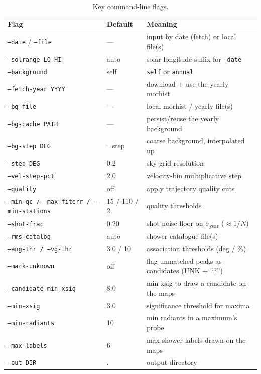 \documentclass[11pt]{article}
\newcommand{\flag}[1]{\texttt{#1}}
\begin{document}
\begin{table}[H]
  \centering
  \small
  \caption{Key command-line flags.}
  \begin{tabular}{lll}
    \toprule
    Flag & Default & Meaning\\
    \midrule
    \flag{--date} / \flag{--file}      & ---    & input by date (fetch) or local file(s)\\
    \flag{--solrange LO HI}            & auto   & solar-longitude suffix for \flag{--date}\\
    \flag{--background}                & self   & \texttt{self} or \texttt{annual}\\
    \flag{--fetch-year YYYY}           & ---    & download + use the yearly morhist\\
    \flag{--bg-file}                   & ---    & local morhist / yearly file(s)\\
    \flag{--bg-cache PATH}             & ---    & persist/reuse the yearly background\\
    \flag{--bg-step DEG}               & =step  & coarse background, interpolated up\\
    \flag{--step DEG}                  & 0.2    & sky-grid resolution\\
    \flag{--vel-step-pct}              & 2.0    & velocity-bin multiplicative step\\
    \flag{--quality}                   & off    & apply trajectory quality cuts\\
    \flag{--min-qc / --max-fiterr / --min-stations} & 15 / 110 / 2 & quality thresholds\\
    \flag{--shot-frac}                 & 0.20   & shot-noise floor on $\sigma_\mathrm{year}$ ($\approx 1/N$)\\
    \flag{--rms-catalog}               & auto   & shower catalogue file(s)\\
    \flag{--ang-thr / --vg-thr}        & 3.0 / 10 & association thresholds (deg / \%)\\
    \flag{--mark-unknown}              & off    & flag unmatched peaks as candidates (UNK + ``?'')\\
    \flag{--candidate-min-xsig}        & 8.0    & min xsig to draw a candidate on the maps\\
    \flag{--min-xsig}                  & 3.0    & significance threshold for maxima\\
    \flag{--min-radiants}              & 10     & min radiants in a maximum's probe\\
    \flag{--max-labels}                & 6      & max shower labels drawn on the maps\\
    \flag{--out DIR}                   & .      & output directory\\
    \bottomrule
  \end{tabular}
\end{table}
\end{document}

